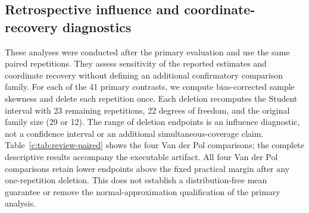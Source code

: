 \subsection{Retrospective influence and coordinate-recovery diagnostics}\label{c:app:review-diagnostics}
These analyses were conducted after the primary evaluation and use the same
paired repetitions. They assess sensitivity of the reported estimates and
coordinate recovery without defining an additional confirmatory comparison family. For each of the 41 primary contrasts, we compute bias-corrected sample
skewness and delete each repetition once. Each deletion recomputes the Student
interval with 23 remaining repetitions, 22 degrees of freedom, and the original
family size (29 or 12). The range of deletion endpoints is an influence diagnostic,
not a confidence interval or an additional simultaneous-coverage claim.
Table~\ref{c:tab:review-paired} shows the four Van der Pol comparisons; the complete
descriptive results accompany the executable artifact.
All four Van der Pol comparisons retain lower endpoints above the fixed practical
margin after any one-repetition deletion. This does not establish a distribution-free
mean guarantee or remove the normal-approximation qualification of the primary analysis.

\begin{table}[htbp]
\caption{Retrospective Van der Pol influence diagnostics. Lower endpoints are multiplied
by $10^3$; the fixed margin on this scale is $0.148907$. Skewness is the bias-corrected
Fisher--Pearson sample coefficient. The minimum deletion lower endpoint is the smallest
over all 24 one-repetition deletions. The final column counts individual paired
differences exceeding the margin; it is not a mean-effect confidence statement.}
\label{c:tab:review-paired}
\centering\small\setlength{\tabcolsep}{4pt}

\end{table}

